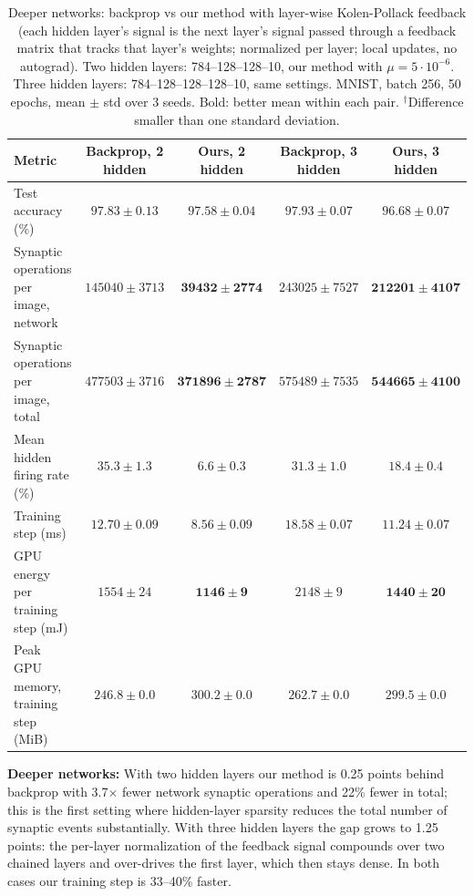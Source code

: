 \documentclass{article}
\begin{document}
\begin{table}[H]
\centering
\small
\caption{Deeper networks: backprop vs our method with layer-wise Kolen-Pollack feedback (each hidden layer's signal is the next layer's signal passed through a feedback matrix that tracks that layer's weights; normalized per layer; local updates, no autograd). Two hidden layers: 784--128--128--10, our method with $\mu = 5\cdot10^{-6}$. Three hidden layers: 784--128--128--128--10, same settings. MNIST, batch 256, 50 epochs, mean $\pm$ std over 3 seeds. Bold: better mean within each pair. $^\dagger$Difference smaller than one standard deviation.}
\label{tab:depth}
\begin{tabular}{lcccc}
\toprule
Metric & Backprop, 2 hidden & Ours, 2 hidden & Backprop, 3 hidden & Ours, 3 hidden \\
\midrule
Test accuracy (\%) & $\boldsymbol{97.83 \pm 0.13}$ & $97.58 \pm 0.04$ & $\boldsymbol{97.93 \pm 0.07}$ & $96.68 \pm 0.07$ \\
Synaptic operations per image, network & $145040 \pm 3713$ & $\boldsymbol{39432 \pm 2774}$ & $243025 \pm 7527$ & $\boldsymbol{212201 \pm 4107}$ \\
Synaptic operations per image, total & $477503 \pm 3716$ & $\boldsymbol{371896 \pm 2787}$ & $575489 \pm 7535$ & $\boldsymbol{544665 \pm 4100}$ \\
Mean hidden firing rate (\%) & $35.3 \pm 1.3$ & $\boldsymbol{6.6 \pm 0.3}$ & $31.3 \pm 1.0$ & $\boldsymbol{18.4 \pm 0.4}$ \\
Training step (ms) & $12.70 \pm 0.09$ & $\boldsymbol{8.56 \pm 0.09}$ & $18.58 \pm 0.07$ & $\boldsymbol{11.24 \pm 0.07}$ \\
GPU energy per training step (mJ) & $1554 \pm 24$ & $\boldsymbol{1146 \pm 9}$ & $2148 \pm 9$ & $\boldsymbol{1440 \pm 20}$ \\
Peak GPU memory, training step (MiB) & $\boldsymbol{246.8 \pm 0.0}$ & $300.2 \pm 0.0$ & $\boldsymbol{262.7 \pm 0.0}$ & $299.5 \pm 0.0$ \\
\bottomrule
\end{tabular}
\end{table}

{\small
\noindent\textbf{Deeper networks:} With two hidden layers our method is 0.25 points behind backprop with 3.7$\times$
fewer network synaptic operations and 22\% fewer in total; this is the first setting where hidden-layer sparsity
reduces the total number of synaptic events substantially. With three hidden layers the gap grows to 1.25 points:
the per-layer normalization of the feedback signal compounds over two chained layers and over-drives the first
layer, which then stays dense. In both cases our training step is 33--40\% faster.
}
\end{document}
